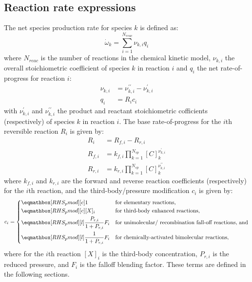 \documentclass[12pt,number,sort&compress]{elsarticle}
\newcommand{\ns}{N_{sp}}
\newcommand{\nr}{N_{reac}}
\begin{document}
\subsection{Reaction rate expressions}
The net species production rate for species $k$ is defined as:
\begin{equation}
 \label{e:spec_rop}
 \dot{\omega}_{k} = \sum_{i=1}^{\nr} \nu_{k,i} q_{i}
\end{equation}
where $\nr$ is the number of reactions in the chemical kinetic model, $\nu_{k, i}$ the overall stoichiometric coefficient of species $k$ in reaction $i$ and $q_i$ the net rate-of-progress for reaction $i$:
\begin{align}
\nu_{k,i} &= \nu^{\prime\prime}_{k,i} - \nu^{\prime}_{k,i} \\
q_{i} &= R_{i} c_{i}
\end{align}
with $\nu^{\prime}_{k,i}$ and $\nu^{\prime\prime}_{k,i}$ the product and reactant stoichiometric cofficients (respectively) of species $k$ in reaction $i$.
The base rate-of-progress for the $i$th reversible reaction $R_{i}$ is given by:
\begin{align}
R_{i} &= {R_{f,i}} - {R_{r,i}} \label{e:ropnet}\\
{R_{f, i}} &= {k_{f, i}} \prod_{k=1}^{\ns} [C]_{k}^{\nu^{\prime}_{k,i}} \label{e:ropf}\\
{R_{r, i}} &= {k_{r, i}} \prod_{k=1}^{\ns} [C]_{k}^{\nu^{\prime\prime}_{k,i}} \label{e:ropr}
\end{align}
where ${k_{f, i}}$ and ${k_{r, i}}$ are the forward and reverse reaction coefficients (respectively) for the $i$th reaction, and the third-body\slash pressure modification $c_{i}$ is given by:
\begin{equation}
\label{e:rxn_pressure}
c_i = \begin{dcases}
  \rhs{pmod}{1}[c] &\text{for elementary reactions,} \\
  \rhs{pmod}{[X]_i}[c] &\text{for third-body enhanced reactions,} \\
  \rhs{pmod}{\frac{P_{r,i}}{1 + P_{r,i}} F_i} &\text{for unimolecular\slash~recombination fall-off reactions, and} \\
  \rhs{pmod}{\frac{1}{1 + P_{r,i}} F_i} &\text{for chemically-activated bimolecular reactions,}
  \end{dcases}
\end{equation}
where for the $i$th reaction $[X]_i$ is the third-body concentration, $P_{r,i}$ is the reduced pressure, and $F_i$ is the falloff blending factor.
These terms are defined in the following sections.
\end{document}
